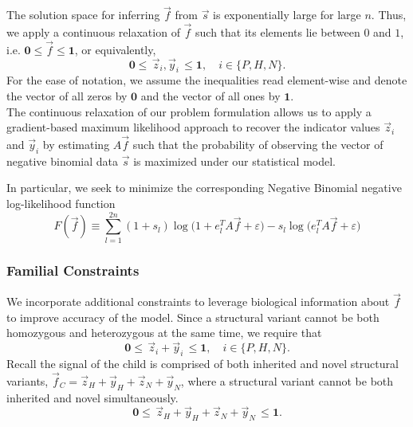 \documentclass{article}
\newcommand{\fC}{\vec{f}_C }
\newcommand{\zH}{\vec{z}_H }
\newcommand{\zN}{\vec{z}_N }
\newcommand{\yH}{\vec{y}_H }
\newcommand{\yN}{\vec{y}_N }
\begin{document}
The solution space for inferring $\vec{f}$ from $\vec{s}$ is exponentially large for large $n$. Thus, we apply a continuous relaxation  of $\vec{f}$ such that its elements lie between $0$ and $1$, i.e. $\mathbf{0} \leq \vec{f} \leq \mathbf{1}$, or equivalently,
\begin{equation}
	\mathbf{0} \leq \, \vec{z}_i, \vec{y}_i \, \leq \mathbf{1}, \quad i \in \{P,H,N\}.
\end{equation}
For the ease of notation, we assume the inequalities read element-wise and denote the vector of all zeros by $\mathbf{0}$ and the vector of all ones by $\mathbf{1}$. \\

The continuous relaxation of our problem formulation allows us to apply a gradient-based maximum likelihood approach to recover the indicator values $\vec{z}_i$ and $\vec{y}_i$ by estimating $A \vec{f}$ such that the probability of observing the vector of negative binomial data $\vec{s}$ is maximized under our statistical model. 

In particular, we seek to minimize the corresponding Negative Binomial negative log-likelihood function
\begin{equation} \label{negBin_negativeLogLikehihood}
	F(\vec{f}) \equiv \sum_{l=1}^{2n}  (1 + s_l)\log \big(1+ e_l^T A \vec{f} + \varepsilon \big) - s_l \log \big( e_l^T A \vec{f} + \varepsilon \big)
\end{equation}

\subsubsection*{Familial Constraints}
We incorporate additional constraints to leverage biological information about $\vec{f}$ to improve accuracy of the model. Since a structural variant cannot be both homozygous and heterozygous at the same time, we require that 
\begin{equation*}
	\mathbf{0} \leq \, \vec{z}_i + \vec{y}_i \, \leq \mathbf{1}, \quad i \in \{P,H,N\}.
\end{equation*}
Recall the signal of the child is comprised of both inherited and novel structural variants, $\fC = \zH + \yH + \zN + \yN$, where a structural variant cannot be both inherited and novel simultaneously. 
\begin{equation*}
	\mathbf{0} \leq \, \zH + \yH + \zN + \yN \, \leq \mathbf{1}.
\end{equation*} 
\end{document}
